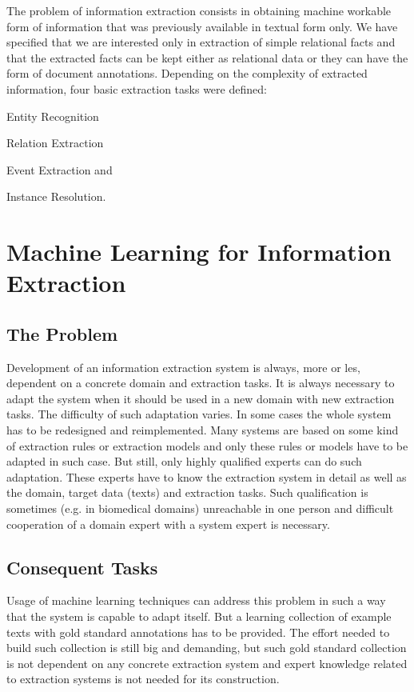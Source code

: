 The problem of information extraction consists in obtaining machine workable form of information that was previously available in textual form only. We have specified that we are interested only in extraction of simple relational facts and that the extracted facts can be kept either as relational data or they can have the form of document annotations. Depending on the complexity of extracted information, four basic extraction tasks were defined:

Entity Recognition

Relation Extraction

Event Extraction and

Instance Resolution.

\section{Machine Learning for Information Extraction}

\subsection{The Problem}

Development of an information extraction system is always, more or les, dependent on a concrete domain and extraction tasks. It is always necessary to adapt the system when it should be used in a new domain with new extraction tasks. The difficulty of such adaptation varies. In some cases the whole system has to be redesigned and reimplemented. Many systems are based on some kind of extraction rules or extraction models and only these rules or models have to be adapted in such case. But still, only highly qualified experts can do such adaptation. These experts have to know the extraction system in detail as well as the domain, target data (texts) and extraction tasks. Such qualification is sometimes (e.g. in biomedical domains) unreachable in one person and difficult cooperation of a domain expert with a system expert is necessary. 

\subsection{Consequent Tasks}

Usage of machine learning techniques can address this problem in such a way that the system is capable to adapt itself. But a learning collection of example texts with gold standard annotations has to be provided. The effort needed to build such collection is still big and demanding, but such gold standard collection is not dependent on any concrete extraction system and expert knowledge related to extraction systems is not needed for its construction. 

